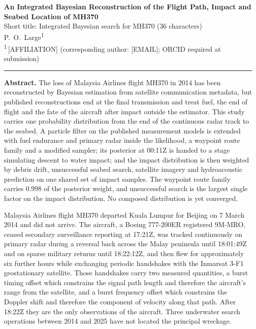 \documentclass[12pt,a4paper]{article}
\makeatletter
\renewcommand\section{\@startsection{section}{1}{0pt}{10pt}{4pt}{\normalfont\normalsize\mdseries}}
\makeatother
\begin{document}
\begin{center}{\large\bfseries An Integrated Bayesian Reconstruction of the Flight Path, Impact and Seabed Location of MH370}\\[4pt]

{\small Short title: Integrated Bayesian search for MH370 \quad(36 characters)}\\[8pt]

{P.\ O.\ Large\textsuperscript{1}}\\[3pt]

{\small\textsuperscript{1}\,[AFFILIATION] \quad (corresponding author: [EMAIL]; ORCID required at submission)}

\end{center}\vspace{4pt}\hrule\vspace{6pt}

\noindent\textbf{Abstract.} The loss of Malaysia Airlines flight MH370 in 2014 has been reconstructed by Bayesian estimation from satellite communication metadata, but published reconstructions end at the final transmission and treat fuel, the end of flight and the fate of the aircraft after impact outside the estimator. This study carries one probability distribution from the end of the continuous radar track to the seabed. A particle filter on the published measurement models is extended with fuel endurance and primary radar inside the likelihood, a waypoint route family and a modified sampler; its posterior at 00:11Z is handed to a stage simulating descent to water impact; and the impact distribution is then weighted by debris drift, unsuccessful seabed search, satellite imagery and hydroacoustic prediction on one shared set of impact samples. The waypoint route family carries 0.998 of the posterior weight, and unsuccessful search is the largest single factor on the impact distribution. No composed distribution is yet converged.

\vspace{4pt}

\section{1.  INTRODUCTION}

Malaysia Airlines flight MH370 departed Kuala Lumpur for Beijing on 7 March 2014 and did not arrive. The aircraft, a Boeing 777-200ER registered 9M-MRO, ceased secondary surveillance reporting at 17:21Z, was tracked continuously on primary radar during a reversal back across the Malay peninsula until 18:01:49Z and on sparse military returns until 18:22:12Z, and then flew for approximately six further hours while exchanging periodic handshakes with the Inmarsat 3-F1 geostationary satellite. Those handshakes carry two measured quantities, a burst timing offset which constrains the signal path length and therefore the aircraft's range from the satellite, and a burst frequency offset which constrains the Doppler shift and therefore the component of velocity along that path. After 18:22Z they are the only observations of the aircraft. Three underwater search operations between 2014 and 2025 have not located the principal wreckage.
\end{document}
